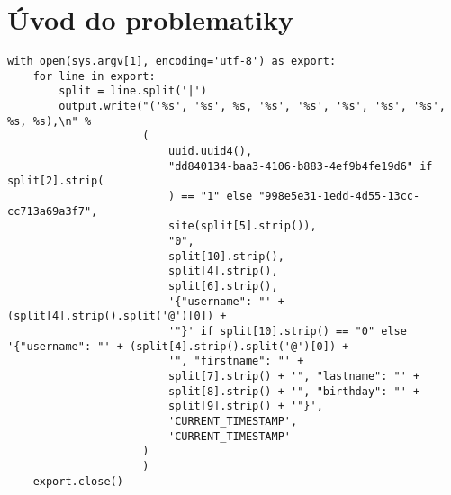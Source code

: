 \chapter{Úvod do problematiky}
\par \lipsum[3]
\cite{coplienOredevDCI}


\begin{verbatim}
with open(sys.argv[1], encoding='utf-8') as export:
	for line in export:
		split = line.split('|')
		output.write("('%s', '%s', %s, '%s', '%s', '%s', '%s', '%s', %s, %s),\n" %
					 (
						 uuid.uuid4(),
						 "dd840134-baa3-4106-b883-4ef9b4fe19d6" if split[2].strip(
						 ) == "1" else "998e5e31-1edd-4d55-13cc-cc713a69a3f7",
						 site(split[5].strip()),
						 "0",
						 split[10].strip(),
						 split[4].strip(),
						 split[6].strip(),
						 '{"username": "' + (split[4].strip().split('@')[0]) +
						 '"}' if split[10].strip() == "0" else '{"username": "' + (split[4].strip().split('@')[0]) +
						 '", "firstname": "' +
						 split[7].strip() + '", "lastname": "' +
						 split[8].strip() + '", "birthday": "' +
						 split[9].strip() + '"}',
						 'CURRENT_TIMESTAMP',
						 'CURRENT_TIMESTAMP'
					 )
					 )
	export.close()
\end{verbatim}

\par \lipsum[8]
\cite{coplienGOTODCI}
\par {}
